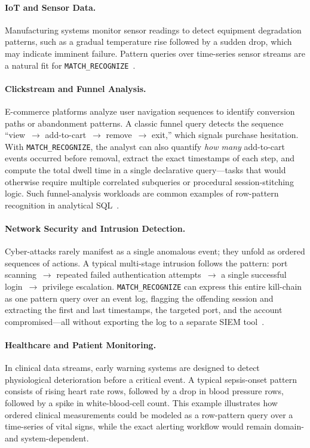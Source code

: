 \paragraph{IoT and Sensor Data.}
Manufacturing systems monitor sensor readings to detect equipment
degradation patterns, such as a gradual temperature rise followed by
a sudden drop, which may indicate imminent failure.  Pattern queries
over time-series sensor streams are a natural fit for
\texttt{MATCH\_RECOGNIZE}~\cite{OracleMR}.

\paragraph{Clickstream and Funnel Analysis.}
E-commerce platforms analyze user navigation sequences to identify
conversion paths or abandonment patterns.  A classic funnel query
detects the sequence
``view~$\rightarrow$ add-to-cart~$\rightarrow$ remove~$\rightarrow$
exit,'' which signals purchase hesitation.  With
\texttt{MATCH\_RECOGNIZE}, the analyst can also quantify \emph{how
many} add-to-cart events occurred before removal, extract the exact
timestamps of each step, and compute the total dwell time in a single
declarative query---tasks that would otherwise require multiple
correlated subqueries or procedural session-stitching logic.
Such funnel-analysis workloads are common examples of row-pattern
recognition in analytical SQL~\cite{hoffa2021snowflake}.

\paragraph{Network Security and Intrusion Detection.}
Cyber-attacks rarely manifest as a single anomalous event; they
unfold as ordered sequences of actions.  A typical multi-stage
intrusion follows the pattern: port scanning~$\rightarrow$ repeated
failed authentication attempts~$\rightarrow$ a single successful
login~$\rightarrow$ privilege escalation.
\texttt{MATCH\_RECOGNIZE} can express this entire kill-chain as one
pattern query over an event log, flagging the offending session and
extracting the first and last timestamps, the targeted port, and the
account compromised---all without exporting the log to a separate
SIEM tool~\cite{petkovic2022fraud}.

\paragraph{Healthcare and Patient Monitoring.}
In clinical data streams, early warning systems are designed to detect
physiological deterioration before a critical event.  A typical
sepsis-onset pattern consists of rising heart rate rows, followed by
a drop in blood pressure rows, followed by a spike in white-blood-cell
count.  This example illustrates how ordered clinical measurements
could be modeled as a row-pattern query over a time-series of vital
signs, while the exact alerting workflow would remain domain- and
system-dependent.

